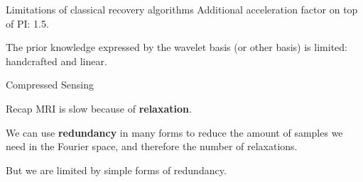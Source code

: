 



\begin{frame}{Limitations of classical recovery algorithms}
    Additional acceleration factor on top of PI: 1.5. %
    
    \pause
    The prior knowledge expressed by the wavelet basis (or other basis) is limited: handcrafted and linear.
\end{frame}

\begin{frame}{Compressed Sensing}
    \begin{block}{Recap}
        MRI is slow because of \textbf{relaxation}. 
        
        \pause
        We can use \textbf{redundancy} in many forms to reduce the amount of samples we need in the Fourier space, and therefore the number of relaxations.
        
        \pause
        But we are limited by simple forms of redundancy.
    \end{block}
\end{frame}